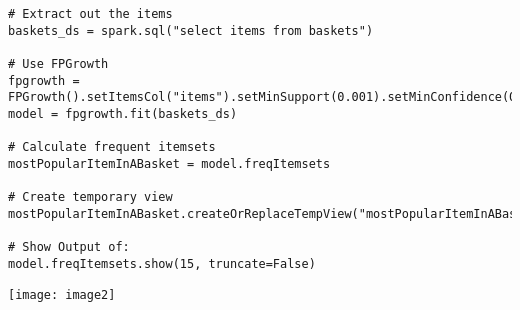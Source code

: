 \documentclass[]{article}
\begin{document}
\begin{comment}
df_orders_dow = spark.sql("""
	select count(order_id) as total_orders, 
		(case 
			when order_dow = '0' then 'Sunday' 
			when order_dow = '1' then 'Monday' 
			when order_dow = '2' then 'Tuesday' 
			when order_dow = '3' then 'Wednesday' 
			when order_dow = '4' then 'Thursday' 
			when order_dow = '5' then 'Friday' 
			when order_dow = '6' then 'Saturday' 
		end) as day_of_week 
	from orders 
	group by order_dow 
	order by total_orders desc
""")

df_orders_dow.show()

df_orders_hour = spark.sql("""
	select count(order_id) as total_orders, order_hour_of_day as hour 
		from orders
	group by order_hour_of_day 
	order by order_hour_of_day
""")

df_orders_hour.show(24)

df_orders_shelf = spark.sql("""
	select d.department, count(distinct p.product_id) as products
		from products p
	inner join departments d
		on d.department_id = p.department_id
	group by d.department
	order by products desc
	limit 10
""")

df_orders_shelf.show()

rawData = spark.sql("select p.product_name, o.order_id from products p inner join order_products_train o where o.product_id = p.product_id")
baskets = rawData.groupBy('order_id').agg(collect_set('product_name').alias('items'))
baskets.createOrReplaceTempView('baskets')
baskets.show(2, truncate=False)

\end{comment}

\begin{verbatim}
# Extract out the items 
baskets_ds = spark.sql("select items from baskets")

# Use FPGrowth
fpgrowth = FPGrowth().setItemsCol("items").setMinSupport(0.001).setMinConfidence(0)
model = fpgrowth.fit(baskets_ds)

# Calculate frequent itemsets
mostPopularItemInABasket = model.freqItemsets

# Create temporary view
mostPopularItemInABasket.createOrReplaceTempView("mostPopularItemInABasket")

# Show Output of:
model.freqItemsets.show(15, truncate=False)
\end{verbatim}

\texttt{[image: image2]}
\end{document}
